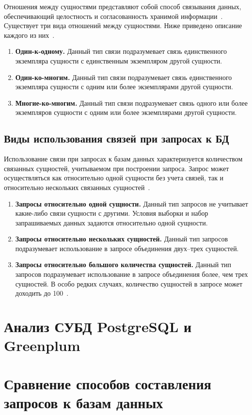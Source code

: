 Отношения между сущностями представляют собой способ связывания данных, обеспечивающий целостность и согласованность хранимой информации~\cite{чаглей2023сравнение}. Существует три вида отношений между сущностями. Ниже приведено описание каждого из них~\cite{стасышин2022проектирование}.

\begin{enumerate}
	\item \textbf{Один-к-одному.} Данный тип связи подразумевает связь единственного экземпляра сущности с единственным экземпляром другой сущности.
	\item \textbf{Один-ко-многим.} Данный тип связи подразумевает связь единственного экземпляра сущности с одним или более экземплярами другой сущности.
	\item \textbf{Многие-ко-многим.} Данный тип связи подразумевает связь одного или более экземпляров сущности с одним или более экземплярами другой сущности.
\end{enumerate}

\subsection{Виды использования связей при запросах к БД}

Использование связи при запросах к базам данных характеризуется количеством связанных сущностей, учитываемом при построении запроса. Запрос может осуществляться как относительно одной сущности без учета связей, так и относительно нескольких связанных сущностей~\cite{li2021teaching}.

\begin{enumerate}
	\item \textbf{Запросы относительно одной сущности.} Данный тип запросов не учитывает какие-либо связи сущности с другими. Условия выборки и набор запрашиваемых данных задаются относительно одной сущности.
	\item \textbf{Запросы относительно нескольких сущностей.} Данный тип запросов подразумевает использование в запросе объединения двух–трех сущностей. 
	\item \textbf{Запросы относительно большого количества сущностей.} Данный тип запросов подразумевает использование в запросе объединения более, чем трех сущностей. В особо редких случаях, количество сущностей в запросе может доходить до 100~\cite{mancini2022efficient}.
\end{enumerate}

\section{Анализ СУБД PostgreSQL и Greenplum}

\section{Сравнение способов составления запросов к базам данных}

